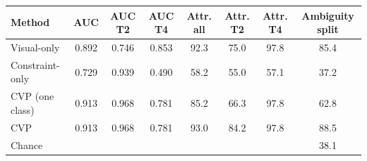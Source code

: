 \begin{tabular}{lccccccc}
\toprule
Method & AUC & AUC T2 & AUC T4 & Attr. all & Attr. T2 & Attr. T4 & Ambiguity split\\
\midrule
Visual-only & 0.892 & 0.746 & 0.853 & 92.3 & 75.0 & 97.8 & 85.4\\
Constraint-only & 0.729 & 0.939 & 0.490 & 58.2 & 55.0 & 57.1 & 37.2\\
CVP (one class) & 0.913 & 0.968 & 0.781 & 85.2 & 66.3 & 97.8 & 62.8\\
CVP & 0.913 & 0.968 & 0.781 & 93.0 & 84.2 & 97.8 & 88.5\\
\midrule
Chance & & & & & & & 38.1\\
\bottomrule
\end{tabular}

